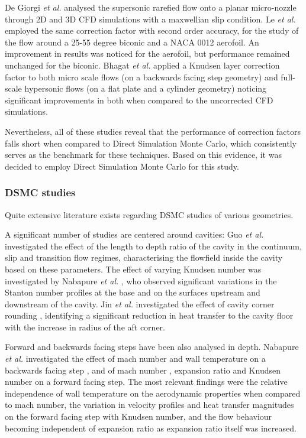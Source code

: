 De Giorgi \textit{et al.} \cite{unisalento} analysed the supersonic rarefied flow onto a planar micro-nozzle through 2D and 3D CFD simulations with a maxwellian slip condition. Le \textit{et al.} \cite{le} employed the same correction factor with second order accuracy, for the study of the flow around a 25-\qty{55}{\deg} degree biconic and a NACA 0012 aerofoil. An improvement in results was noticed for the aerofoil, but performance remained unchanged for the biconic. Bhagat \textit{et al.} applied a Knudsen layer correction factor to both micro scale flows (on a backwards facing step geometry) \cite{bhagatmicro} and full-scale hypersonic flows (on a flat plate and a cylinder geometry) \cite{bhagatmacro} noticing significant improvements in both when compared to the uncorrected CFD simulations.

Nevertheless, all of these studies reveal that the performance of correction factors falls short when compared to Direct Simulation Monte Carlo, which consistently serves as the benchmark for these techniques. Based on this evidence, it was decided to employ Direct Simulation Monte Carlo for this study.

\subsubsection{DSMC studies}

Quite extensive literature exists regarding DSMC studies of various geometries. 

A significant number of studies are centered around cavities: Guo \textit{et al.} \cite{guo} investigated the effect of the length to depth ratio of the cavity in the continuum, slip and transition flow regimes, characterising the flowfield inside the cavity based on these parameters. The effect of varying Knudsen number was investigated by Nabapure \textit{et al.} \cite{nabapurecav}, who observed significant variations in the Stanton number profiles at the base and on the surfaces upstream and downstream of the cavity. Jin \textit{et al.} investigated the effect of cavity corner rounding \cite{jinrounding}, identifying a significant reduction in heat transfer to the cavity floor with the increase in radius of the aft corner.

Forward and backwards facing steps have been also analysed in depth. Nabapure \textit{et al.} investigated the effect of mach number and wall temperature on a backwards facing step \cite{nabapuremach}, and of mach number \cite{nabapuremachfor}, expansion ratio \cite{nabapureexp} and Knudsen number \cite{nabapurekn} on a forward facing step. The most relevant findings were the relative independence of wall temperature on the aerodynamic properties when compared to mach number, the variation in velocity profiles and heat transfer magnitudes on the forward facing step with Knudsen number, and the flow behaviour becoming independent of expansion ratio as expansion ratio itself was increased.

